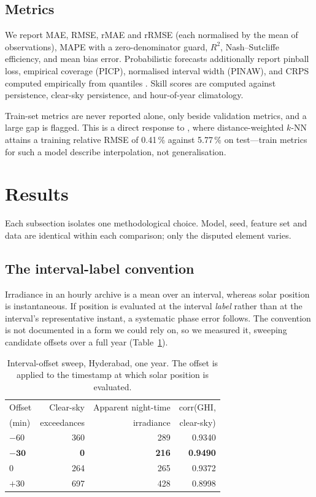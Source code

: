 \documentclass[conference]{IEEEtran}
\begin{document}
\subsection{Metrics}

We report MAE, RMSE, rMAE and rRMSE (each normalised by the mean of
observations), MAPE with a zero-denominator guard, $R^{2}$,
Nash--Sutcliffe efficiency, and mean bias error. Probabilistic
forecasts additionally report pinball loss, empirical coverage (PICP),
normalised interval width (PINAW), and CRPS computed empirically from
quantiles \cite{gneiting2007}. Skill scores are computed against
persistence, clear-sky persistence, and hour-of-year climatology.

Train-set metrics are never reported alone, only beside validation
metrics, and a large gap is flagged. This is a direct response to
\cite{P2}, where distance-weighted $k$-NN attains a training relative
RMSE of 0.41\,\% against 5.77\,\% on test---train metrics for such a
model describe interpolation, not generalisation.

\section{Results}
\label{sec:results}

Each subsection isolates one methodological choice. Model, seed,
feature set and data are identical within each comparison; only the
disputed element varies.

\subsection{The interval-label convention}
\label{sec:f1}

Irradiance in an hourly archive is a mean over an interval, whereas
solar position is instantaneous. If position is evaluated at the
interval \emph{label} rather than at the interval's representative
instant, a systematic phase error follows. The convention is not
documented in a form we could rely on, so we measured it, sweeping
candidate offsets over a full year (Table~\ref{tab:f1}).

\begin{table}[!t]
\caption{Interval-offset sweep, Hyderabad, one year. The offset is
applied to the timestamp at which solar position is evaluated.}
\label{tab:f1}
\centering
\begin{tabular}{lrrr}
\toprule
Offset & Clear-sky & Apparent night-time & $\mathrm{corr}$(GHI, \\
(min) & exceedances & irradiance & clear-sky) \\
\midrule
$-60$ & 360 & 289 & 0.9340 \\
$\mathbf{-30}$ & \textbf{0} & \textbf{216} & \textbf{0.9490} \\
$0$   & 264 & 265 & 0.9372 \\
$+30$ & 697 & 428 & 0.8998 \\
\bottomrule
\end{tabular}
\end{table}
\end{document}
